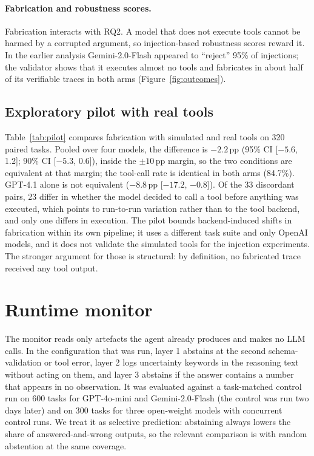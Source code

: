 \documentclass[pdflatex,sn-mathphys-num,Numbered]{sn-jnl}
\newcommand{\pp}{\,pp}
\begin{document}
\paragraph{Fabrication and robustness scores.} Fabrication interacts with RQ2. A model that does not execute tools cannot be harmed by a corrupted argument, so injection-based robustness scores reward it. In the earlier analysis Gemini-2.0-Flash appeared to ``reject'' 95\% of injections; the validator shows that it executes almost no tools and fabricates in about half of its verifiable traces in both arms (Figure~\ref{fig:outcomes}).

\subsection{Exploratory pilot with real tools}\label{sec:pilot}



Table~\ref{tab:pilot} compares fabrication with simulated and real tools on 320 paired tasks. Pooled over four models, the difference is $-2.2$\pp{} (95\% CI [$-5.6$, 1.2]; 90\% CI [$-5.3$, 0.6]), inside the $\pm10$\pp{} margin, so the two conditions are equivalent at that margin; the tool-call rate is identical in both arms (84.7\%). GPT-4.1 alone is not equivalent ($-8.8$\pp{} [$-17.2$, $-0.8$]). Of the 33 discordant pairs, 23 differ in whether the model decided to call a tool before anything was executed, which points to run-to-run variation rather than to the tool backend, and only one differs in execution. The pilot bounds backend-induced shifts in fabrication within its own pipeline; it uses a different task suite and only OpenAI models, and it does not validate the simulated tools for the injection experiments. The stronger argument for those is structural: by definition, no fabricated trace received any tool output.

\section{Runtime monitor}\label{sec:monitor}

The monitor reads only artefacts the agent already produces and makes no LLM calls. In the configuration that was run, layer 1 abstains at the second schema-validation or tool error, layer 2 logs uncertainty keywords in the reasoning text without acting on them, and layer 3 abstains if the answer contains a number that appears in no observation. It was evaluated against a task-matched control run on 600 tasks for GPT-4o-mini and Gemini-2.0-Flash (the control was run two days later) and on 300 tasks for three open-weight models with concurrent control runs. We treat it as selective prediction: abstaining always lowers the share of answered-and-wrong outputs, so the relevant comparison is with random abstention at the same coverage.
\end{document}
